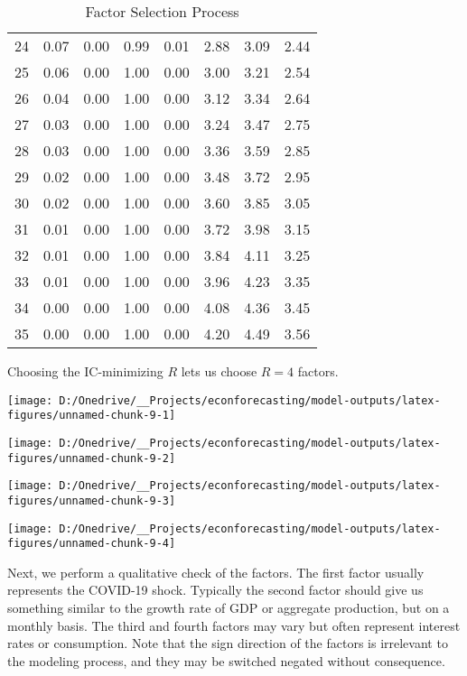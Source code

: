 \documentclass[11pt, letterpaper]{article}\usepackage[]{graphicx}\usepackage[]{color}
\begin{document}
\begin{table}[H]
\begin{tabular}{cccccccc}
   24 & 0.07 & 0.00 & 0.99 & 0.01 & 2.88 & 3.09 & 2.44 \\ 
   25 & 0.06 & 0.00 & 1.00 & 0.00 & 3.00 & 3.21 & 2.54 \\ 
   26 & 0.04 & 0.00 & 1.00 & 0.00 & 3.12 & 3.34 & 2.64 \\ 
   27 & 0.03 & 0.00 & 1.00 & 0.00 & 3.24 & 3.47 & 2.75 \\ 
   28 & 0.03 & 0.00 & 1.00 & 0.00 & 3.36 & 3.59 & 2.85 \\ 
   29 & 0.02 & 0.00 & 1.00 & 0.00 & 3.48 & 3.72 & 2.95 \\ 
   30 & 0.02 & 0.00 & 1.00 & 0.00 & 3.60 & 3.85 & 3.05 \\ 
   31 & 0.01 & 0.00 & 1.00 & 0.00 & 3.72 & 3.98 & 3.15 \\ 
   32 & 0.01 & 0.00 & 1.00 & 0.00 & 3.84 & 4.11 & 3.25 \\ 
   33 & 0.01 & 0.00 & 1.00 & 0.00 & 3.96 & 4.23 & 3.35 \\ 
   34 & 0.00 & 0.00 & 1.00 & 0.00 & 4.08 & 4.36 & 3.45 \\ 
   35 & 0.00 & 0.00 & 1.00 & 0.00 & 4.20 & 4.49 & 3.56 \\ 
   \hline
\end{tabular}
\endgroup
\caption{Factor Selection Process} 
\end{table}


Choosing the IC-minimizing $R$ lets us choose $R = 4$ factors.



{\centering \texttt{[image: D:/Onedrive/\_\_Projects/econforecasting/model-outputs/latex-figures/unnamed-chunk-9-1]} 

}




{\centering \texttt{[image: D:/Onedrive/\_\_Projects/econforecasting/model-outputs/latex-figures/unnamed-chunk-9-2]} 

}




{\centering \texttt{[image: D:/Onedrive/\_\_Projects/econforecasting/model-outputs/latex-figures/unnamed-chunk-9-3]} 

}




{\centering \texttt{[image: D:/Onedrive/\_\_Projects/econforecasting/model-outputs/latex-figures/unnamed-chunk-9-4]} 

}




Next, we perform a qualitative check of the factors. The first factor usually represents the COVID-19 shock. Typically the second factor should give us something similar to the growth rate of GDP or aggregate production, but on a monthly basis. The third and fourth factors may vary but often represent interest rates or consumption. Note that the sign direction of the factors is irrelevant to the modeling process, and they may be switched negated without consequence. 
\end{document}
